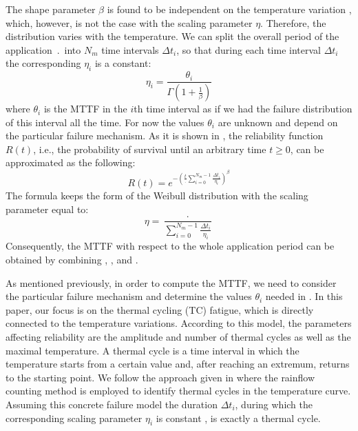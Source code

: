 The shape parameter $\beta$ is found to be independent on the temperature variation \cite{chang2006}, which, however, is not the case with the scaling parameter $\eta$. Therefore, the distribution varies with the temperature. We can split the overall period of the application $\period$ into $N_m$ time intervals $\Delta t_i$, so that during each time interval $\Delta t_i$ the corresponding $\eta_i$ is a constant:
\begin{equation} \label{eq:eta-one}
  \eta_i = \frac{\theta_i}{\Gamma(1 + \frac{1}{\beta})}
\end{equation}
where $\theta_i$ is the MTTF in the $i$th time interval as if we had the failure distribution of this interval all the time. For now the values $\theta_i$ are unknown and depend on the particular failure mechanism. As it is shown in \cite{xiang2010}, the reliability function $R(t)$, i.e., the probability of survival until an arbitrary time $t \geq 0$, can be approximated as the following:
\[
  R(t) = e^{-(\frac{t}{\period} \sum_{i=0}^{N_m - 1} \frac{\Delta t_i}{\eta_i})^\beta}
\]
The formula keeps the form of the Weibull distribution with the scaling parameter equal to:
\begin{equation} \label{eq:eta-many}
  \eta = \frac{\period}{\sum_{i=0}^{N_m - 1} \frac{\Delta t_i}{\eta_i}}
\end{equation}
Consequently, the MTTF with respect to the whole application period can be obtained by combining , , and .

As mentioned previously, in order to compute the MTTF, we need to consider the particular failure mechanism and determine the values $\theta_i$ needed in . In this paper, our focus is on the thermal cycling (TC) fatigue, which is directly connected to the temperature variations. According to this model, the parameters affecting reliability are the amplitude and number of thermal cycles as well as the maximal temperature. A thermal cycle is a time interval in which the temperature starts from a certain value and, after reaching an extremum, returns to the starting point. We follow the approach given in \cite{xiang2010} where the rainflow counting method is employed to identify thermal cycles in the temperature curve. Assuming this concrete failure model the duration $\Delta t_i$, during which the corresponding scaling parameter $\eta_i$ is constant , is exactly a thermal cycle.

